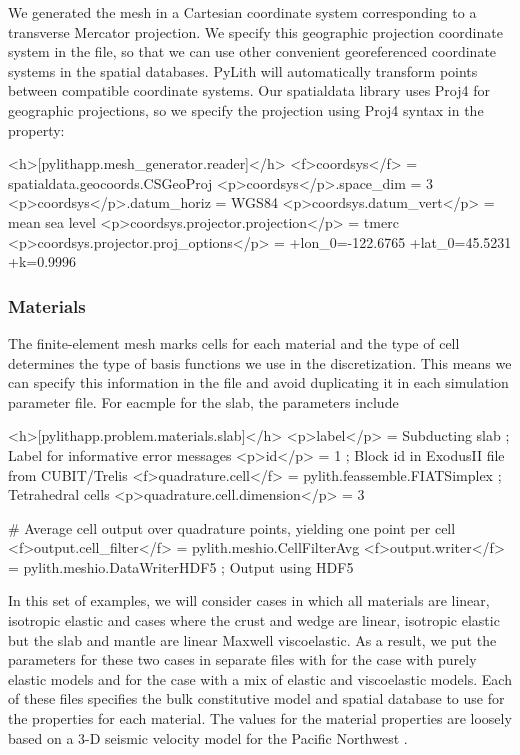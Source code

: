 We generated the mesh in a Cartesian coordinate system corresponding
to a transverse Mercator projection. We specify this geographic
projection coordinate system in the  file, so
that we can use other convenient georeferenced coordinate systems in
the spatial databases. PyLith will automatically transform points
between compatible coordinate systems. Our spatialdata library uses
Proj4 for geographic projections, so we specify the projection using
Proj4 syntax in the  property:
\begin{cfg}
<h>[pylithapp.mesh_generator.reader]</h>
<f>coordsys</f> = spatialdata.geocoords.CSGeoProj
<p>coordsys</p>.space_dim = 3
<p>coordsys</p>.datum_horiz = WGS84
<p>coordsys.datum_vert</p> = mean sea level
<p>coordsys.projector.projection</p> = tmerc
<p>coordsys.projector.proj_options</p> = +lon_0=-122.6765 +lat_0=45.5231 +k=0.9996
\end{cfg}

\subsubsection{Materials}

The finite-element mesh marks cells for each material and the type of
cell determines the type of basis functions we use in the
discretization. This means we can specify this information in the
 file and avoid duplicating it in each
simulation parameter file. For eacmple for the slab, the parameters include
\begin{cfg}
<h>[pylithapp.problem.materials.slab]</h>
<p>label</p> = Subducting slab ; Label for informative error messages
<p>id</p> = 1 ; Block id in ExodusII file from CUBIT/Trelis
<f>quadrature.cell</f> = pylith.feassemble.FIATSimplex ; Tetrahedral cells
<p>quadrature.cell.dimension</p> = 3

# Average cell output over quadrature points, yielding one point per cell
<f>output.cell_filter</f> = pylith.meshio.CellFilterAvg
<f>output.writer</f> = pylith.meshio.DataWriterHDF5 ; Output using HDF5
\end{cfg}

In this set of examples, we will consider cases in which all materials
are linear, isotropic elastic and cases where the crust and wedge are
linear, isotropic elastic but the slab and mantle are linear Maxwell
viscoelastic. As a result, we put the parameters for these two cases
in separate  files with  for
the case with purely elastic models and
 for the case with a mix of elastic
and viscoelastic models. Each of these files specifies the bulk
constitutive model and spatial database to use for the properties for
each material. The values for the material properties are loosely
based on a 3-D seismic velocity model for the Pacific Northwest 
\cite{Stephenson:2007}.

